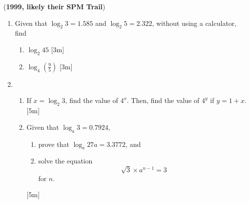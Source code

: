 \documentclass[notoc,notitlepage]{tufte-book}
\begin{document}
(\textbf{1999, likely their SPM Trail})
\begin{enumerate}
  \item Given that $\log_2 3 = 1.585$ and $\log_2 5 = 2.322$, without using a
    calculator, find
    \begin{enumerate}
      \item $\log_2 45$ [3m]
      \item $\log_4 \left( \frac{9}{5} \right)$ [3m]
    \end{enumerate}

  \item 
    \begin{enumerate}
      \item If $x = \log_2 3$, find the value of $4^x$. Then, find the value of
        $4^y$ if $y = 1 + x$. [5m]
      \item Given that $\log_a 3 = 0.7924$,
        \begin{enumerate}
          \item prove that $\log_a 27a = 3.3772$, and
          \item solve the equation
            \begin{equation*}
              \sqrt{3} \times a^{n - 1} = 3
            \end{equation*}
            for $n$.
        \end{enumerate}
        [5m]
    \end{enumerate}
\end{enumerate}
\end{document}
